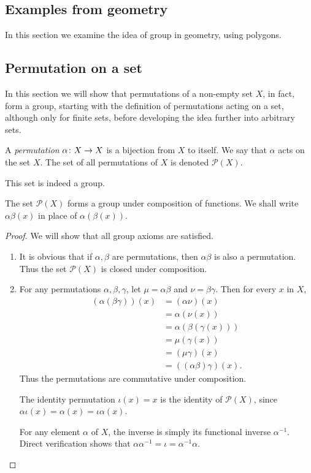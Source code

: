 \documentclass[main.tex]{subfiles}
\begin{document}
	\subsection{Examples from geometry}
		In this section we examine the idea of group in geometry, using polygons.
		
		
	\subsection{Permutation on a set}
	 In this section we will show that permutations of a non-empty set $X$, in fact, form a group, starting with the definition of permutations acting on a set, although only for finite sets, before developing the idea further into arbitrary sets.
				
				\begin{definition}
					A \textit{permutation} $\alpha \colon X \rightarrow X$ is a bijection from $X$ to itself. We say that $\alpha$ acts on the set $X$. The set of all permutations of $X$ is denoted $\mathcal{P}(X)$.				
				\end{definition}
				This set is indeed a group.
				\begin{theorem}
					The set $\mathcal{P}(X)$ forms a group under composition of functions. We shall write $\alpha\beta(x)$ in place of $\alpha(\beta(x))$.
				\end{theorem}
				\begin{proof}
					We will show that all group axioms are satisfied.
					\begin{enumerate}
						\item It is obvious that if $\alpha, \beta$ are permutations, then $\alpha\beta$ is also a permutation. Thus the set $\mathcal{P}(X)$ is closed under composition.
						
						\item For any permutations $\alpha, \beta, \gamma$, let $\mu = \alpha\beta$ and $\nu = \beta\gamma$. Then for every $x$ in $X$,
						\begin{equation}
						\begin{aligned}
							(\alpha(\beta\gamma))(x) & = (\alpha\nu)(x) \\
									& = \alpha(\nu(x))	\\
									& = \alpha(\beta(\gamma(x))) \\
									& = \mu(\gamma(x))	\\
									& = (\mu\gamma)(x) \\
									& = ((\alpha\beta)\gamma)(x).
						\end{aligned}
						\end{equation}
						Thus the permutations are commutative under composition.
						
						\ii The identity permutation $\iota (x) = x$ is the identity of $\mathcal{P}(X)$, since $\alpha\iota(x) = \alpha(x) = \iota\alpha(x)$.
						
						\ii For any element $\alpha$ of $X$, the inverse is simply its functional inverse $\alpha^{-1}$. Direct verification shows that $\alpha\alpha^{-1} = \iota = \alpha^{-1}\alpha$.
					\end{enumerate}
				\end{proof}
\end{document}
